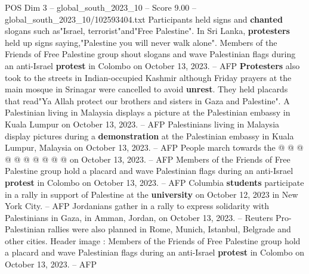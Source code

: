 \begin{textsample}{POS Dim 3 – global\_south\_2023\_10 – Score 9.00 – global\_south\_2023\_10/102593404.txt}
Participants held signs and \textbf{chanted} slogans such as"Israel, terrorist"and"Free Palestine".
In Sri Lanka, \textbf{protesters} held up signs saying,"Palestine you will never walk alone".
Members of the Friends of Free Palestine group shout slogans and wave Palestinian flags during an anti-Israel \textbf{protest} in Colombo on October 13, 2023. -- AFP \textbf{Protesters} also took to the streets in Indian-occupied Kashmir although Friday prayers at the main mosque in Srinagar were cancelled to avoid \textbf{unrest}.
They held placards that read"Ya Allah protect our brothers and sisters in Gaza and Palestine".
A Palestinian living in Malaysia displays a picture at the Palestinian embassy in Kuala Lumpur on October 13, 2023. -- AFP Palestinians living in Malaysia display pictures during a \textbf{demonstration} at the Palestinian embassy in Kuala Lumpur, Malaysia on October 13, 2023. -- AFP People march towards the @ @ @ @ @ @ @ @ @ @ on October 13, 2023. -- AFP Members of the Friends of Free Palestine group hold a placard and wave Palestinian flags during an anti-Israel \textbf{protest} in Colombo on October 13, 2023. -- AFP Columbia \textbf{students} participate in a rally in support of Palestine at the \textbf{university} on October 12, 2023 in New York City. -- AFP Jordanians gather in a rally to express solidarity with Palestinians in Gaza, in Amman, Jordan, on October 13, 2023. -- Reuters Pro-Palestinian rallies were also planned in Rome, Munich, Istanbul, Belgrade and other cities.
Header image : Members of the Friends of Free Palestine group hold a placard and wave Palestinian flags during an anti-Israel \textbf{protest} in Colombo on October 13, 2023. -- AFP

\end{textsample}
